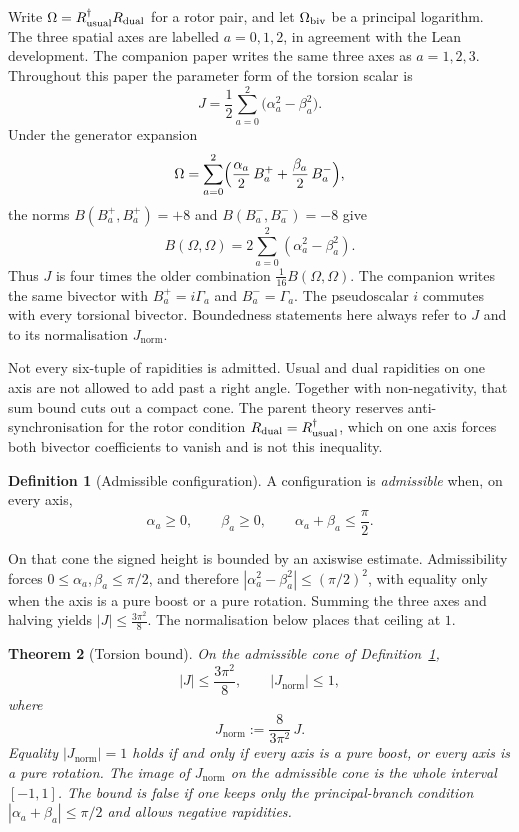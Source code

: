 \documentclass[a4paper]{article}
\newtheorem{theorem}{Theorem}[section]
\theoremstyle{definition}
\newtheorem{definition}[theorem]{Definition}
\newcommand{\Jnorm}{J_{\mathrm{norm}}}
\newcommand{\Jbound}{\frac{3\pi^2}{8}}
\begin{document}
Write \(\Omega=R_{\rm usual}^\dagger R_{\rm dual}\) for a rotor pair,
and let \(\Omega_{\rm biv}\) be a principal logarithm. The three
spatial axes are labelled \(a=0,1,2\), in agreement with the Lean
development. The companion paper writes the same three axes as
\(a=1,2,3\). Throughout this paper the parameter form of the torsion
scalar is
\begin{equation}
\label{eq:J-raw}
J = \frac12\sum_{a=0}^{2}\bigl(\alpha_a^2-\beta_a^2\bigr).
\end{equation}
Under the generator expansion
\begin{equation}
\label{eq:omega-exp}
\Omega=\sum_{a=0}^{2}\Bigl(\frac{\alpha_a}{2}\,B^+_a
+\frac{\beta_a}{2}\,B^-_a\Bigr),
\end{equation}
the norms \(B(B^+_a,B^+_a)=+8\) and \(B(B^-_a,B^-_a)=-8\) give
\begin{equation}
\label{eq:killing-omega}
B(\Omega,\Omega)=2\sum_{a=0}^{2}(\alpha_a^2-\beta_a^2).
\end{equation}
Thus \(J\) is four times the older combination
\(\frac1{16}B(\Omega,\Omega)\). The companion writes the same bivector
with \(B^+_a=i\Gamma_a\) and \(B^-_a=\Gamma_a\). The pseudoscalar \(i\)
commutes with every torsional bivector. Boundedness statements here
always refer to \(J\) and to its normalisation \(\Jnorm\).

Not every six-tuple of rapidities is admitted. Usual and dual
rapidities on one axis are not allowed to add past a right angle.
Together with non-negativity, that sum bound cuts out a compact cone.
The parent theory reserves anti-synchronisation for the rotor condition
\(R_{\rm dual}=R_{\rm usual}^\dagger\), which on one axis forces both
bivector coefficients to vanish and is not this inequality.

\begin{definition}[Admissible configuration]
\label{def:admissible}
A configuration is \emph{admissible} when, on every axis,
\[
\alpha_a\ge 0,\qquad \beta_a\ge 0,\qquad \alpha_a+\beta_a\le \frac{\pi}{2}.
\]
\end{definition}

On that cone the signed height is bounded by an axiswise estimate.
Admissibility forces \(0\le\alpha_a,\beta_a\le\pi/2\), and therefore
\(|\alpha_a^2-\beta_a^2|\le(\pi/2)^2\), with equality only when the
axis is a pure boost or a pure rotation. Summing the three axes and
halving yields \(|J|\le\Jbound\). The normalisation below places that
ceiling at \(1\).

\begin{theorem}[Torsion bound]
\label{thm:torsion-bound}
On the admissible cone of Definition~\ref{def:admissible},
\[
|J|\le\Jbound,\qquad |\Jnorm|\le 1,
\]
where
\begin{equation}
\label{eq:Jnorm}
\Jnorm := \frac{8}{3\pi^2}\,J.
\end{equation}
Equality \(|\Jnorm|=1\) holds if and only if every axis is a pure boost,
or every axis is a pure rotation. The image of \(\Jnorm\) on the
admissible cone is the whole interval \([-1,1]\). The bound is false if
one keeps only the principal-branch condition
\(|\alpha_a+\beta_a|\le\pi/2\) and allows negative rapidities.
\end{theorem}
\end{document}

